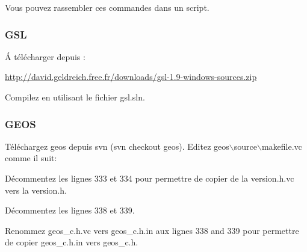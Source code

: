 Vous pouvez rassembler ces commandes dans un script.

% 
% 

\subsubsection{GSL}
\'A télécharger depuis :

\url{http://david.geldreich.free.fr/downloads/gsl-1.9-windows-sources.zip}

Compilez en utilisant le fichier gsl.sln.

% 
% 
% 
% 
% 
% 

\subsubsection{GEOS}
Téléchargez geos depuis svn (svn checkout  geos).
Editez geos$\backslash$source$\backslash$makefile.vc comme il suit:

Décommentez les lignes 333 et 334 pour permettre de copier de la version.h.vc vers la version.h.

Décommentez les lignes 338 et 339.

Renommez geos\_c.h.vc vers geos\_c.h.in aux lignes 338 and 339 pour permettre de copier geos\_c.h.in vers geos\_c.h.

